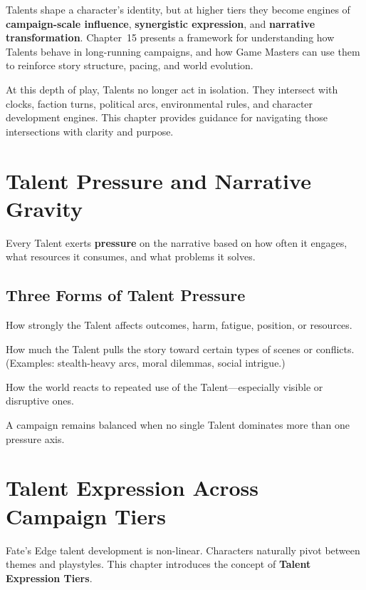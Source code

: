 \documentclass[11pt]{book}
\begin{document}
Talents shape a character's identity, but at higher tiers they become engines of
\textbf{campaign-scale influence}, \textbf{synergistic expression}, and \textbf{narrative transformation}.
Chapter~15 presents a framework for understanding how Talents behave in long-running campaigns,
and how Game Masters can use them to reinforce story structure, pacing, and world evolution.

At this depth of play, Talents no longer act in isolation.
They intersect with clocks, faction turns, political arcs, environmental rules,
and character development engines.
This chapter provides guidance for navigating those intersections with clarity and purpose.

\section{Talent Pressure and Narrative Gravity}

Every Talent exerts \textbf{pressure} on the narrative based on how often it engages,
what resources it consumes, and what problems it solves.

\subsection{Three Forms of Talent Pressure}

\begin{description}[leftmargin=1.8em]
    \item[Mechanical Pressure]  
    How strongly the Talent affects outcomes, harm, fatigue, position, or resources.

    \item[Narrative Pressure]  
    How much the Talent pulls the story toward certain types of scenes or conflicts.
    (Examples: stealth-heavy arcs, moral dilemmas, social intrigue.)

    \item[Environmental Pressure]  
    How the world reacts to repeated use of the Talent---especially visible or disruptive ones.
\end{description}

A campaign remains balanced when no single Talent dominates more than one pressure axis.

\section{Talent Expression Across Campaign Tiers}

Fate's Edge talent development is non-linear.
Characters naturally pivot between themes and playstyles.
This chapter introduces the concept of \textbf{Talent Expression Tiers}.
\end{document}
